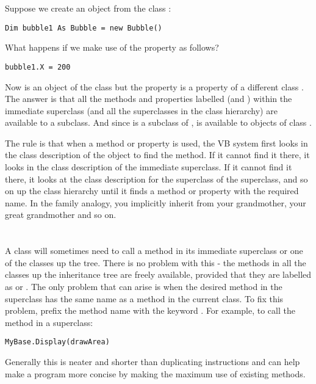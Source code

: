 		Suppose we create an object  from the class :
		\begin{lstlisting}
Dim bubble1 As Bubble = new Bubble()
		\end{lstlisting}
		What happens if we make use of the property  as follows?
		\begin{lstlisting}
bubble1.X = 200
		\end{lstlisting}
		Now  is an object of the class  but the property  is a property of a different class . The answer is that all the methods and properties labelled  (and ) within the immediate superclass (and all the superclasses in the class hierarchy) are available to a subclass. And since  is a subclass of ,  is available to objects of class .
		
		The rule is that when a method or property is used, the VB system first looks in the class description of the object to find the method. If it cannot find it there, it looks in the class description of the immediate superclass. If it cannot find it there, it looks at the class description for the superclass of the superclass, and so on up the class hierarchy until it finds a method or property with the required name. In the family analogy, you implicitly inherit from your grandmother, your great grandmother and so on.

		
	\section{}
		A class will sometimes need to call a method in its immediate superclass or one of the classes up the tree. There is no problem with this - the methods in all the classes up the inheritance tree are freely available, provided that they are labelled as  or . The only problem that can arise is when the desired method in the superclass has the same name as a method in the current class. To fix this problem, prefix the method name with the keyword . For example, to call the method  in a superclass:
		\begin{lstlisting}
MyBase.Display(drawArea)
		\end{lstlisting}
		Generally this is neater and shorter than duplicating instructions and can help make a program more concise by making the maximum use of existing methods.


